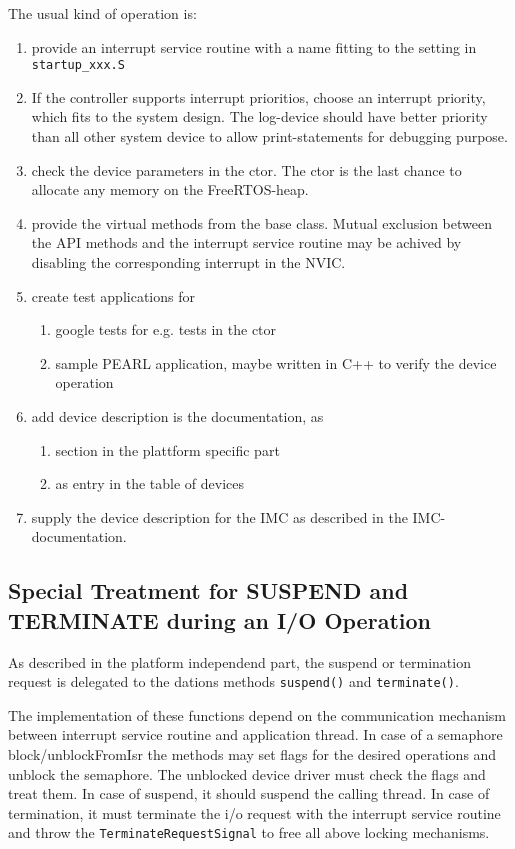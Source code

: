 The usual kind of operation is:
\begin{enumerate}
\item provide an interrupt service routine with a name fitting to the
   setting in \verb|startup_xxx.S|
\item If the controller supports interrupt prioritios,
choose an interrupt priority, which fits to the system design.
 The log-device should have better priority than all other
 system device to allow print-statements for debugging purpose.
\item check the device parameters in the ctor. The ctor is the last chance to
   allocate any memory on the FreeRTOS-heap.
\item provide the virtual methods from the base class. Mutual exclusion
   between the API methods and the interrupt service routine may
   be achived by disabling the corresponding interrupt in the NVIC.
\item create test applications for 
  \begin{enumerate}
  \item google tests for e.g. tests in the ctor
  \item sample PEARL application, maybe  written in C++ to verify
        the device operation
  \end{enumerate}
\item add device description is the documentation, as
  \begin{enumerate}
  \item section in the plattform specific part
  \item as entry in the table of devices
  \end{enumerate}
\item supply the device description for the IMC as described in the IMC-documentation.
\end{enumerate}

\subsection{Special Treatment for SUSPEND and TERMINATE during an I/O Operation}
As described in the platform independend part, the suspend or termination request
is delegated to the dations methods \texttt{suspend()} and \texttt{terminate()}.

The implementation of these functions depend on the communication mechanism 
between interrupt service routine and application thread. 
In case of a semaphore block/unblockFromIsr the methods may set flags for the desired
operations and unblock the semaphore. 
The unblocked device driver must check the flags and treat them. In case of suspend, 
it should suspend the calling thread.
In case of termination, it must terminate the i/o request with the interrupt service routine
and throw the \texttt{TerminateRequestSignal}  to free all above locking mechanisms.

